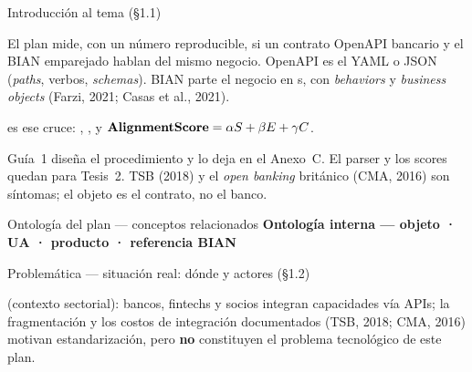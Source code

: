\documentclass[aspectratio=169,11pt,spanish]{beamer}
\begin{document}
\begin{frame}{Introducción al tema (§1.1)}
  \marcadorNoExponer
  \begin{planpanel}
  \small
  El plan mide, con un número reproducible, si un contrato OpenAPI bancario y el \ServiceDomain{} BIAN emparejado hablan del mismo negocio. OpenAPI es el YAML o JSON (\textit{paths}, verbos, \textit{schemas}). BIAN parte el negocio en \ServiceDomain{}s, con \textit{behaviors} y \textit{business objects} (Farzi, 2021; Casas et al., 2021).

  \vspace{0.35em}
   es ese cruce: \SemanticScore{}, \StructuralScore{}, \CoverageScore{} y $\textbf{AlignmentScore}{}=\alpha S+\beta E+\gamma C$.

  \vspace{0.35em}
  Guía~1 diseña el procedimiento y lo deja en el Anexo~C. El parser y los scores quedan para Tesis~2. TSB (2018) y el \textit{open banking} británico (CMA, 2016) son síntomas; el objeto es el contrato, no el banco.
  \end{planpanel}
\end{frame}

\begin{frame}{Ontología del plan --- conceptos relacionados}
  \marcadorNoExponer
  \vspace{0.05em}
  {\normalsize\bfseries\textcolor{uninavy}{Ontología interna --- objeto · UA · producto · referencia BIAN}}
\end{frame}

\begin{frame}{Problemática --- situación real: dónde y actores (§1.2)}
  \vspace{0.15em}
  \begin{planpanel}
  \small
   (contexto sectorial): bancos, fintechs y socios integran capacidades vía APIs; la fragmentación y los costos de integración documentados (TSB, 2018; CMA, 2016) motivan estandarización, pero \textbf{no} constituyen el problema tecnológico de este plan.
  \end{planpanel}
\end{frame}
\end{document}

